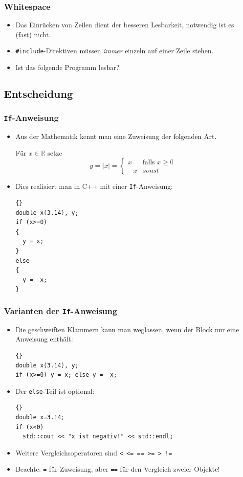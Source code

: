 \documentclass[ignorenonframetext,12pt]{beamer}
\theoremstyle{definition}
\theoremstyle{definition}
\begin{document}
\begin{frame}[fragile]
\frametitle{Whitespace}
\begin{itemize}
\item Das Einrücken von Zeilen dient der besseren Lesbarkeit,
  notwendig ist es (fast) nicht.
\item \lstinline{#include}-Direktiven müssen \textsl{immer} einzeln
  auf einer Zeile stehen.
\item Ist das folgende Programm lesbar?

\end{itemize}
\end{frame}

\subsection{Entscheidung}

\begin{frame}[fragile]
\frametitle{\lstinline{If}-Anweisung}
\begin{itemize}
\item Aus der Mathematik kennt man eine \glqq{}Zuweisung\grqq{} der
  folgenden Art.

Für $x\in\mathbb{R}$ setze
\begin{equation*}
y = |x| = \left\{\begin{array}{ll}
x & \text{falls $x\geq 0$}\\
-x & sonst
\end{array}\right.
\end{equation*}
\item Dies realisiert man in C++ mit einer \lstinline{If}-Anweisung:
{\scriptsize\begin{lstlisting}{}
double x(3.14), y;
if (x>=0)
{
  y = x;
}
else
{
  y = -x;
}
\end{lstlisting}}
\end{itemize}
\end{frame}

\begin{frame}[fragile]
\frametitle{Varianten der \lstinline{If}-Anweisung}
\begin{itemize}
\item Die geschweiften Klammern kann man weglassen, wenn der Block nur
  eine Anweisung enthält:
{\scriptsize\begin{lstlisting}{}
double x(3.14), y;
if (x>=0) y = x; else y = -x;
\end{lstlisting}}
\item Der \lstinline{else}-Teil ist optional:
{\scriptsize\begin{lstlisting}{}
double x=3.14;
if (x<0)
  std::cout << "x ist negativ!" << std::endl;
\end{lstlisting}}
\item Weitere Vergleichsoperatoren sind \lstinline{< <= == >= > !=}\\
\item Beachte: \lstinline{=} für Zuweisung, aber \lstinline{==} für den
Vergleich zweier Objekte!
\end{itemize}
\end{frame}
\end{document}
